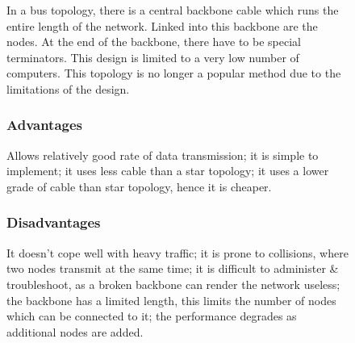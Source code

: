 \begin{figure}[H]
    \begin{minipage}[H]{0.6\textwidth}
        In a bus topology, there is a central backbone cable which runs the entire length of the network. Linked into this backbone are the nodes. At the end of the backbone, there have to be special terminators. This design is limited to a very low number of computers. This topology is no longer a popular method due to the limitations of the design.
        \subsubsection*{Advantages}
        Allows relatively good rate of data transmission; it is simple to implement; it uses less cable than a star topology; it uses a lower grade of cable than star topology, hence it is cheaper.
        \subsubsection*{Disadvantages}
        It doesn't cope well with heavy traffic; it is prone to collisions, where two nodes transmit at the same time; it is difficult to administer \& troubleshoot, as a broken backbone can render the network useless; the backbone has a limited length, this limits the number of nodes which can be connected to it; the performance degrades as additional nodes are added.
    \end{minipage}\hfill
    \begin{minipage}[H]{0.35\textwidth}
        \centering
    \end{minipage}\hfill
\end{figure}

